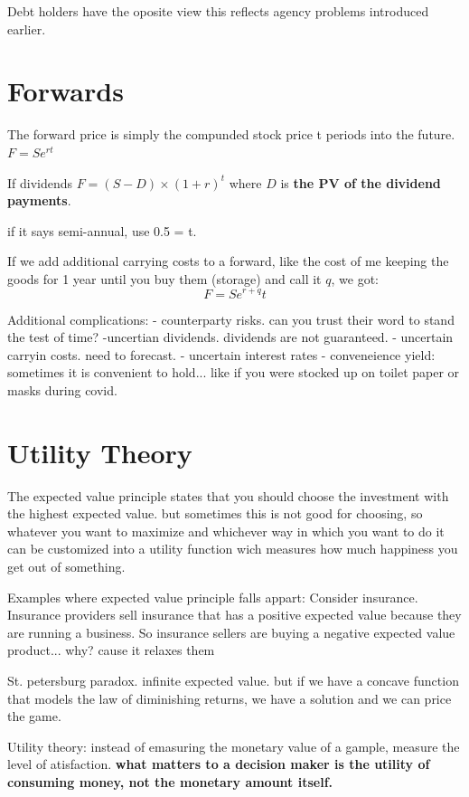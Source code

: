 \documentclass{article}
\begin{document}
Debt holders have the oposite view this reflects agency problems introduced earlier.

\section{Forwards}
The forward price is simply the compunded stock price t periods into the future. $F= S e^{rt}$

If dividends $F = (S-D) \times (1+r)^t$ where $D$ is \textbf{the PV of the dividend payments}.

if it says semi-annual, use 0.5 = t.

If we add additional carrying costs to a forward, like the cost of me keeping the goods for 1 year until you buy them (storage) and call it $q$, we got:
\[ F = S e^{r+q}t\]

Additional complications:
-  counterparty risks. can you trust their word to stand the test of time?
-uncertian dividends. dividends are not guaranteed. 
- uncertain carryin costs. need to forecast.
- uncertain interest rates
- conveneience yield: sometimes it is convenient to hold... like if you were stocked up on toilet paper or masks during covid.

\section{Utility Theory}
The expected value principle states that you should choose the investment with the highest expected value. but sometimes this is not good for choosing, so whatever you want to maximize and whichever way in which you want to do it can be customized into a utility function wich measures how much happiness you get out of something. 

Examples where expected value principle falls appart:
Consider insurance. Insurance providers sell insurance that has a positive expected value because they are running a business. So insurance sellers are buying a negative expected value product... why? cause it relaxes them

St. petersburg paradox.
infinite expected value. but if we have a concave function that models the law of diminishing returns, we have a solution and we can price the game. 

Utility theory:
instead of emasuring the monetary value of a gample, measure the level of atisfaction. \textbf{what matters to a decision maker is the utility of consuming money, not the monetary amount itself.}
\end{document}
